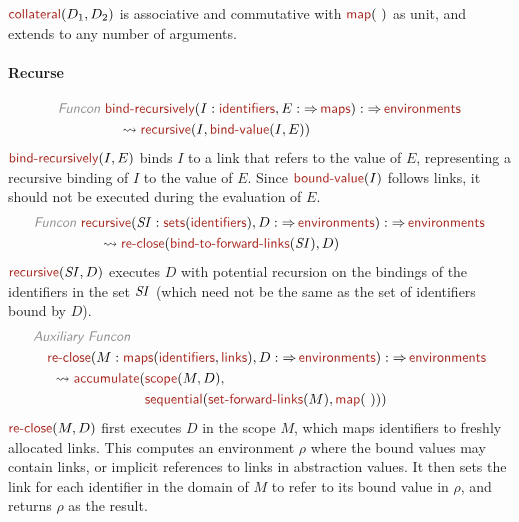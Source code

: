 \documentclass[fleqn]{article}
\newcommand{\KEY}[1]{\textsf{\textit{\color{Gray}#1}}}
\newcommand{\VAR}[1]{\mathit{\small#1}}
\newcommand{\NAME}[2][\PLAIN]{#1{Name_#2}{\textsf{\color{Mahogany}#2}}}
\newcommand{\PLAIN}[1]{}
\newcommand{\TO}{\mathop{\Rightarrow}}
\begin{document}
$ \NAME{collateral}(D_1, D_2) $ is associative and commutative with $ \NAME{map}(~) $ as unit, 
and extends to any number of arguments.

\paragraph*{Recurse}

\begin{align*}
  \KEY{Funcon} ~
  & \NAME{bind-recursively}(I:\NAME{identifiers}, E:\TO \NAME{maps}) : \TO \NAME{environments}
\\
  & \quad {} \leadsto \NAME{recursive}({I}, \NAME{bind-value}(I, E))
\end{align*}
% 
$ \NAME{bind-recursively}(I, E) $ binds $ I $ to a link that refers to the value of $ E $, 
representing a recursive binding of $ I $ to the value of $ E $.
Since $ \NAME{bound-value}(I) $ follows links, it should not be executed during the
evaluation of $ E $.
% 
\begin{align*}
\KEY{Funcon} ~
  & \NAME{recursive}(\VAR{SI}:\NAME{sets}(\NAME{identifiers}), D:\TO \NAME{environments}) : \TO \NAME{environments}
\\
  & \quad ~ {} \leadsto \NAME{re-close}(\NAME{bind-to-forward-links}(\VAR{SI}), D)
\end{align*}
% 
$ \NAME{recursive}(\VAR{SI}, D) $ executes $ D $ with potential recursion on the bindings of 
the identifiers in the set $ \VAR{SI} $ (which need not be the same as the set of
identifiers bound by $ D $).
% 
\begin{align*}
  & \KEY{Auxiliary Funcon} ~
\\
  & \quad \NAME{re-close}(M:\NAME{maps}(\NAME{identifiers}, \NAME{links}), D:\TO \NAME{environments}) : \TO \NAME{environments}
\\
  & \quad ~ {} \leadsto \NAME{accumulate}(
    \begin{aligned}[t]
    & \NAME{scope}(M, D), 
    \\
    & \NAME{sequential}(\NAME{set-forward-links}(M), \NAME{map}(~)))
    \end{aligned}
\end{align*}
% 
$ \NAME{re-close}(M, D) $ first executes $ D $ in the scope $ M $, which maps identifiers
to freshly allocated links. This computes an environment $ \rho $ where the bound
values may contain links, or implicit references to links in abstraction
values. It then sets the link for each identifier in the domain of $ M $ to
refer to its bound value in $ \rho $, and returns $ \rho $ as the result.
\end{document}
